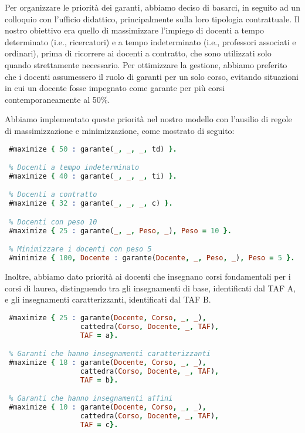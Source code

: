 Per organizzare le priorità dei garanti, abbiamo deciso di basarci, in seguito ad un 
colloquio con l'ufficio didattico, principalmente sulla loro tipologia contrattuale. 
Il nostro obiettivo era quello di massimizzare l'impiego di docenti a tempo determinato 
(i.e., ricercatori) e a tempo indeterminato (i.e., professori associati e ordinari), prima 
di ricorrere ai docenti a contratto, che sono utilizzati solo quando strettamente necessario. 
Per ottimizzare la gestione, abbiamo preferito che i docenti assumessero il ruolo di 
garanti per un solo corso, evitando situazioni in cui un docente fosse impegnato come 
garante per più corsi contemporaneamente al 50\%.

Abbiamo implementato queste priorità nel nostro modello con l'ausilio di regole di 
massimizzazione e minimizzazione, come mostrato di seguito:

\begin{lstlisting}[language=prolog, caption=Gestione delle priorità dei docenti.]
 % Docenti a tempo determinato (ricercatori)
 #maximize { 50 : garante(_, _, _, td) }.

 % Docenti a tempo indeterminato
 #maximize { 40 : garante(_, _, _, ti) }.

 % Docenti a contratto
 #maximize { 32 : garante(_, _, _, c) }.

 % Docenti con peso 10
 #maximize { 25 : garante(_, _, Peso, _), Peso = 10 }.

 % Minimizzare i docenti con peso 5
 #minimize { 100, Docente : garante(Docente, _, Peso, _), Peso = 5 }.
\end{lstlisting}

Inoltre, abbiamo dato priorità ai docenti che insegnano corsi fondamentali per i 
corsi di laurea, distinguendo tra gli insegnamenti di base, identificati dal TAF A, 
e gli insegnamenti caratterizzanti, identificati dal TAF B.

\begin{lstlisting}[language=prolog, caption=Gestione delle priorità del TAF.]
 % Garanti che hanno insegnamenti di base
 #maximize { 25 : garante(Docente, Corso, _, _), 
                  cattedra(Corso, Docente, _, TAF), 
                  TAF = a}.

 % Garanti che hanno insegnamenti caratterizzanti
 #maximize { 18 : garante(Docente, Corso, _, _), 
                  cattedra(Corso, Docente, _, TAF), 
                  TAF = b}.

 % Garanti che hanno insegnamenti affini
 #maximize { 10 : garante(Docente, Corso, _, _), 
                  cattedra(Corso, Docente, _, TAF), 
                  TAF = c}.
\end{lstlisting}

